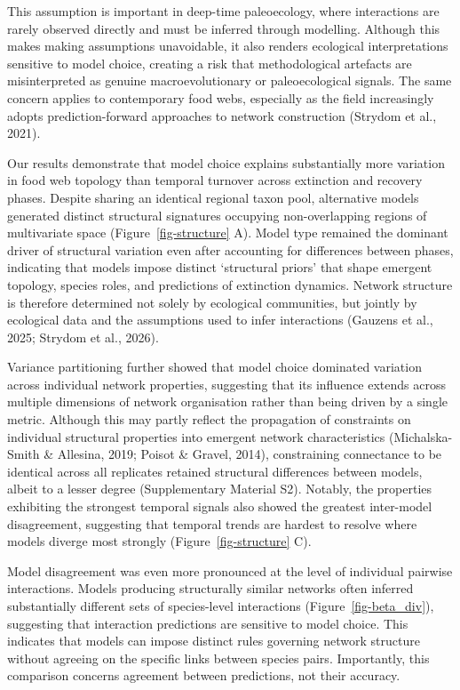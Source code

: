 \documentclass[
]{article}
\begin{document}
This assumption is important in deep-time paleoecology, where
interactions are rarely observed directly and must be inferred through
modelling. Although this makes making assumptions unavoidable, it also
renders ecological interpretations sensitive to model choice, creating a
risk that methodological artefacts are misinterpreted as genuine
macroevolutionary or paleoecological signals. The same concern applies
to contemporary food webs, especially as the field increasingly adopts
prediction-forward approaches to network construction (Strydom et al.,
2021).

Our results demonstrate that model choice explains substantially more
variation in food web topology than temporal turnover across extinction
and recovery phases. Despite sharing an identical regional taxon pool,
alternative models generated distinct structural signatures occupying
non-overlapping regions of multivariate space
(Figure~\ref{fig-structure} A). Model type remained the dominant driver
of structural variation even after accounting for differences between
phases, indicating that models impose distinct `structural priors' that
shape emergent topology, species roles, and predictions of extinction
dynamics. Network structure is therefore determined not solely by
ecological communities, but jointly by ecological data and the
assumptions used to infer interactions (Gauzens et al., 2025; Strydom et
al., 2026).

Variance partitioning further showed that model choice dominated
variation across individual network properties, suggesting that its
influence extends across multiple dimensions of network organisation
rather than being driven by a single metric. Although this may partly
reflect the propagation of constraints on individual structural
properties into emergent network characteristics (Michalska-Smith \&
Allesina, 2019; Poisot \& Gravel, 2014), constraining connectance to be
identical across all replicates retained structural differences between
models, albeit to a lesser degree (Supplementary Material S2). Notably,
the properties exhibiting the strongest temporal signals also showed the
greatest inter-model disagreement, suggesting that temporal trends are
hardest to resolve where models diverge most strongly
(Figure~\ref{fig-structure} C).

Model disagreement was even more pronounced at the level of individual
pairwise interactions. Models producing structurally similar networks
often inferred substantially different sets of species-level
interactions (Figure~\ref{fig-beta_div}), suggesting that interaction
predictions are sensitive to model choice. This indicates that models
can impose distinct rules governing network structure without agreeing
on the specific links between species pairs. Importantly, this
comparison concerns agreement between predictions, not their accuracy.
\end{document}

